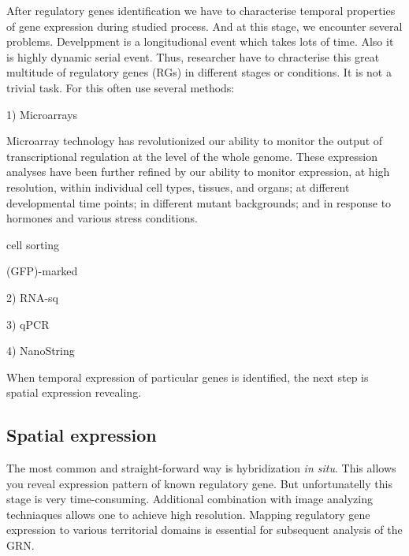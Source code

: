 \documentclass[a4paper, oneside]{report}
\begin{document}
After regulatory genes identification we have to characterise temporal properties of gene expression during studied process.
And at this stage, we encounter several problems.
Develppment is a longitudional event which takes lots of time.
Also it is highly dynamic serial event.
Thus, researcher have to chracterise this great multitude of regulatory genes (RGs) in different stages or conditions.
It is not a trivial task.
For this often use several methods:

\vspace{2mm}

1) Microarrays

\vspace{2mm}

Microarray technology has revolutionized our ability to monitor the output of transcriptional regulation at the level of the whole genome.
These expression analyses have been further refined by our ability to monitor expression, at high resolution, within individual cell types, tissues, and organs; at different developmental time points; in different mutant backgrounds;
and in response to hormones and various stress conditions.

cell sorting

(GFP)-marked

\vspace{2mm}

2) RNA-sq

\vspace{2mm}



\vspace{2mm}

3) qPCR 

4) NanoString 

\vspace{2mm}

When temporal expression of particular genes is identified, the next step is spatial expression revealing.

\subsection*{Spatial expression}

The most common and straight-forward way is hybridization \textit{in situ}.
This allows you reveal expression pattern of known regulatory gene.  
But unfortunatelly this stage is very time-consuming.
Additional combination with image analyzing techniaques allows one to achieve high resolution.
Mapping regulatory gene expression to various territorial domains is essential for subsequent analysis of the GRN.
\end{document}
